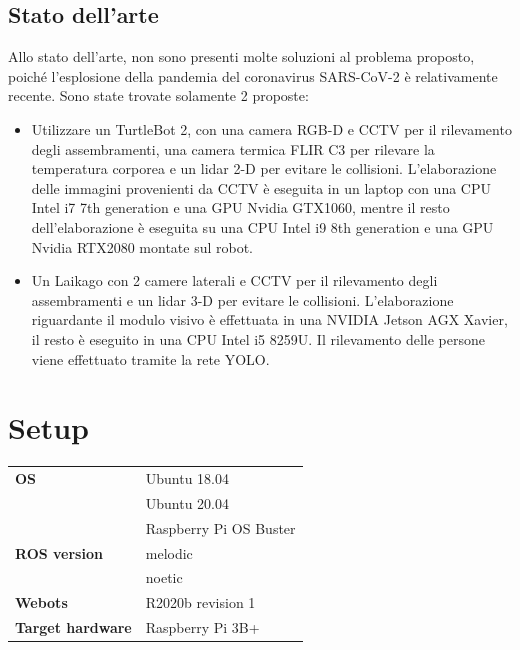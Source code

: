 \documentclass[a4paper]{article}
\begin{document}
	\subsection{Stato dell'arte}\label{subsec:Stato-dell-arte}
	Allo stato dell'arte, non sono presenti molte soluzioni al problema proposto, poiché l'esplosione della pandemia del coronavirus SARS-CoV-2 è relativamente recente. Sono state trovate solamente 2 proposte:
	\begin{itemize} 
		\item Utilizzare un TurtleBot 2, con una camera RGB-D e CCTV per il rilevamento degli
		assembramenti, una camera termica FLIR C3 per rilevare la temperatura corporea e un
		lidar 2-D per evitare le collisioni. L'elaborazione delle immagini provenienti da CCTV è eseguita in un laptop con una CPU Intel i7 7th generation e una GPU Nvidia GTX1060, mentre il resto dell'elaborazione è eseguita su una CPU Intel i9 8th generation e una GPU Nvidia RTX2080 montate sul robot.~\cite{sathyamoorthy2020covidrobot}
	
		\item Un Laikago con 2 camere laterali e CCTV per il rilevamento degli
		assembramenti e un lidar 3-D per evitare le collisioni. 
		L'elaborazione riguardante il modulo visivo è effettuata in una NVIDIA Jetson AGX Xavier,
		il resto è eseguito in una CPU Intel i5 8259U. Il rilevamento delle persone viene effettuato tramite la rete YOLO.~\cite{fan2020autonomous}
	\end{itemize}
	
	
	\section{Setup}\label{sec:Setup}
	\begin{table}[H]
		\centering
		\begin{tabular}{l l}
			\hline
			{\bf OS} & Ubuntu 18.04 \\
					 & Ubuntu 20.04 \\ 
					 & Raspberry Pi OS Buster \\ \hline
			{\bf ROS version} & melodic \\
							  & noetic \\ \hline
			\textbf{Webots} & R2020b revision 1\\ \hline
			{\bf Target hardware} & Raspberry Pi 3B+ \\ \hline
		\end{tabular}
	\end{table}
	
\end{document}
